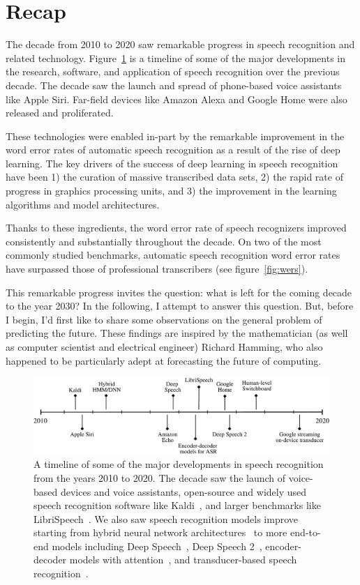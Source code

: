 \section{Recap}
\label{sec:recap}

The decade from 2010 to 2020 saw remarkable progress in speech recognition and
related technology. Figure~\ref{fig:asr_timeline} is a timeline of some of the
major developments in the research, software, and application of speech
recognition over the previous decade. The decade saw the launch and spread of
phone-based voice assistants like Apple Siri. Far-field devices like Amazon
Alexa and Google Home were also released and proliferated.

These technologies were enabled in-part by the remarkable improvement in the
word error rates of automatic speech recognition as a result of the rise of
deep learning. The key drivers of the success of deep learning in speech
recognition have been 1) the curation of massive transcribed data sets, 2) the
rapid rate of progress in graphics processing units, and 3) the improvement in
the learning algorithms and model architectures.

Thanks to these ingredients, the word error rate of speech recognizers improved
consistently and substantially throughout the decade. On two of the most
commonly studied benchmarks, automatic speech recognition word error rates have
surpassed those of professional transcribers (see figure~\ref{fig:wers}).

This remarkable progress invites the question: what is left for the coming
decade to the year 2030? In the following, I attempt to answer this question.
But, before I begin, I'd first like to share some observations on the general
problem of predicting the future. These findings are inspired by the
mathematician (as well as computer scientist and electrical engineer) Richard
Hamming, who also happened to be particularly adept at forecasting the future
of computing.

\begin{figure}
\centering
\includegraphics[width=\linewidth]{figures/asr_timeline}
\caption{A timeline of some of the major developments in speech recognition
    from the years 2010 to 2020. The decade saw the launch of
    voice-based devices and voice assistants, open-source and widely used
    speech recognition software like Kaldi~\citep{povey2011kaldi}, and larger
    benchmarks like LibriSpeech~\citep{panayotov2015librispeech}. We also saw
    speech recognition models improve starting from hybrid neural network
    architectures~\citep{hinton2012deep} to more end-to-end models including
    Deep Speech~\citep{hannun2014deep}, Deep Speech 2~\citep{amodei2016deep},
    encoder-decoder models with attention~\citep{chorowski2015attention}, and
    transducer-based speech recognition~\citep{he2019streaming}.}
\label{fig:asr_timeline}
\end{figure}
